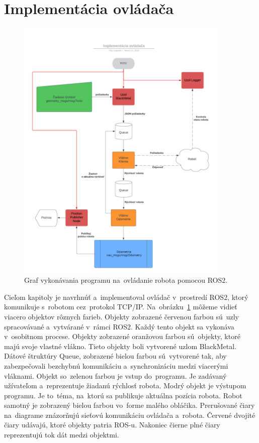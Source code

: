 
\section{Implementácia ovládača}
\label{sec:program}

\begin{figure}[!htbp]
	\begin{center}
		\includegraphics[width=0.9\textwidth]{img/BlackMetal_flowchart.png}
	\end{center}
	\caption{Graf vykonávania programu na~ovládanie robota pomocou ROS2.}
	\label{fig:flowchart}
\end{figure}

Cieľom kapitoly je navrhnúť a~implementoval ovládač v~prostredí ROS2, ktorý komunikuje s~robotom
cez~protokol TCP/IP. Na~obrázku~\ref{fig:flowchart} môžeme vidieť viacero objektov rôznych
farieb. Objekty zobrazené červenou farbou sú~uzly spracovávané a~vytvárané v~rámci ROS2. Každý
tento objekt sa vykonáva v~osobitnom procese. Objekty zobrazené oranžovou farbou sú~objekty, ktoré
majú svoje vlastné vlákno. Tieto objekty boli vytvorené uzlom BlackMetal. Dátové štruktúry Queue,
zobrazené bielou farbou sú~vytvorené tak, aby zabezpečovali bezchybnú komunikáciu a~synchronizáciu
medzi viacerými vláknami. Objekt so~zelenou farbou je vstup do~programu. Je zadávaný užívateľom
a~reprezentuje žiadanú rýchlosť robota. Modrý objekt je výstupom programu. Je to~téma, na~ktorú
sa publikuje aktuálna pozícia robota. Robot samotný je zobrazený bielou farbou vo~forme malého
obláčika. Prerušované čiary na~diagrame znázorňujú sieťovú komunikáciu ovládača a~robota. Červené
dvojité čiary udávajú, ktoré objekty patria ROS-u. Nakoniec čierne plné čiary reprezentujú tok dát
medzi objektmi.

